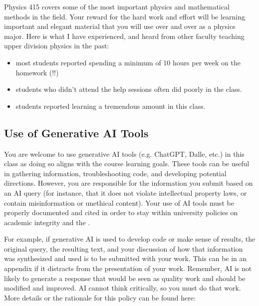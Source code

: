 \documentclass[letterpaper,10pt,english]{jupyterBook}
\begin{document}
\sphinxAtStartPar
Physics 415 covers some of the most important physics and mathematical methods in the field. Your reward for the hard work and effort will be learning important and elegant material that you will use over and over as a physics major. Here is what I have experienced, and heard from
other faculty teaching upper division physics in the past:
\begin{itemize}
\item {} 
\sphinxAtStartPar
most students reported spending a minimum of 10 hours per week on the
homework (!!)

\item {} 
\sphinxAtStartPar
students who didn’t attend the help sessions
often did poorly in the class.

\item {} 
\sphinxAtStartPar
students reported learning a tremendous amount in this class.

\end{itemize}

\sphinxAtStartPar
{}


\subsection{Use of Generative AI Tools}
\label{\detokenize{content/0_course/6_environment:use-of-generative-ai-tools}}
\sphinxAtStartPar
You are welcome to use generative AI tools (e.g. ChatGPT, Dall\sphinxhyphen{}e, etc.) in this class as doing so aligns with the course learning goals. These tools can be useful in gathering information, troubleshooting code, and developing potential directions. However, you are responsible for the information you submit based on an AI query (for instance, that it does not violate intellectual property laws, or contain misinformation or unethical content). Your use of AI tools must be properly documented and cited in order to stay within university policies on academic integrity and the .

\sphinxAtStartPar
For example, if generative AI is used to develop code or make sense of results, the original query, the resulting text, and your discussion of how that information was synthesized and used is  to be submitted with your work. This can be in an appendix if it distracts from the presentation of your work. Remember, AI is not likely to generate a response that would be seen as quality work and should be modified and improved. AI cannot think critically, so you must do that work. More details or the rationale for this policy can be found here: 
\end{document}
